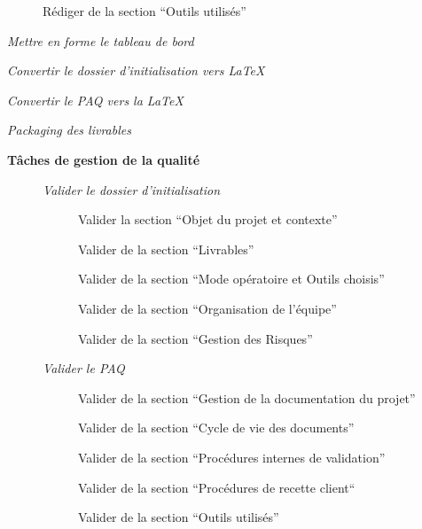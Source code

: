 \begin{description}
\begin{description}
\begin{description}
                    \item[\textbullet] Rédiger de la section “Outils utilisés”
                \end{description}
            \item[\textbullet] \it{Mettre en forme le tableau de bord}
            \item[\textbullet] \it{Convertir le dossier d’initialisation vers LaTeX}
            \item[\textbullet] \it{Convertir le PAQ vers la LaTeX}
            \item[\textbullet] \it{Packaging des livrables} \\
        \end{description}
    \item[] \bf{Tâches de gestion de la qualité}
        \begin{description}
            \item[\textbullet] \it{Valider le dossier d’initialisation}
                \begin{description}
                    \item[\textbullet] Valider la section “Objet du projet et contexte”
                    \item[\textbullet] Valider de la section “Livrables”
                    \item[\textbullet] Valider de la section “Mode opératoire et Outils choisis”
                    \item[\textbullet] Valider de la section “Organisation de l’équipe”
                    \item[\textbullet] Valider de la section “Gestion des Risques”
                \end{description}
            \item[\textbullet] \it{Valider le PAQ}
                \begin{description}
                    \item[\textbullet] Valider de la section “Gestion de la documentation du projet”
                    \item[\textbullet] Valider de la section “Cycle de vie des documents”
                    \item[\textbullet] Valider de la section “Procédures internes de validation”
                    \item[\textbullet] Valider de la section “Procédures de recette client“
                    \item[\textbullet] Valider de la section “Outils utilisés”

\end{description}
\end{description}
\end{description}

